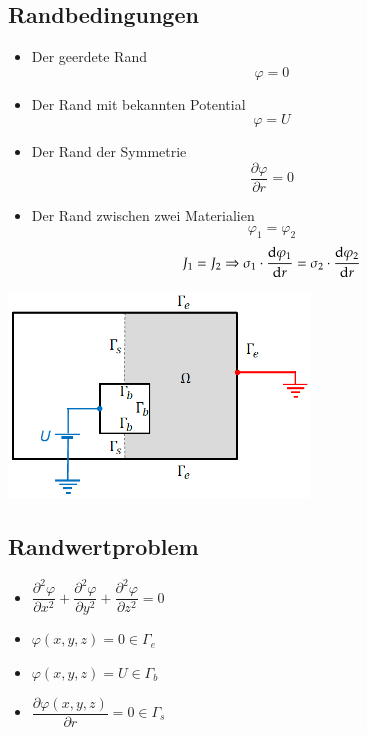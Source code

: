 \subsection{Randbedingungen}
\begin{minipage}{8cm}
	\begin{itemize}
		\item Der geerdete Rand \[\varphi = 0\]
		\item Der Rand mit bekannten Potential \[ \varphi = U \]
		\item Der Rand der Symmetrie \[ \dfrac{\partial\varphi}{\partial r} = 0\]
		\item Der Rand zwischen zwei Materialien \[\varphi_{1}=\varphi_{2}\]
        \[J_{1}=J_{2} \Rightarrow \sigma_{1} \cdot \frac{\mathop{}\!\mathrm{d} \varphi_{1}}{\mathop{}\!\mathrm{d} r}=\sigma_{2} \cdot \frac{\mathop{}\!\mathrm{d} \varphi_{2}}{\mathop{}\!\mathrm{d} r}\]
	\end{itemize}
\end{minipage}
\begin{minipage}{8cm}
	\includegraphics[width=8cm]{images/randbedinung_ES.png}
\end{minipage}
\subsection{Randwertproblem}
\begin{multicols}{2}
	\begin{itemize}
		\item $\dfrac{\partial^2\varphi}{\partial x^2} +  \dfrac{\partial^2\varphi}{\partial y^2} + \dfrac{\partial^2\varphi}{\partial z^2}=0 $
		\item $\varphi(x,y,z)=0 \in \Gamma_e$
		\item $\varphi(x,y,z)=U \in \Gamma_b$
		\item $ \dfrac{\partial\varphi(x,y,z)}{\partial r} = 0 \in \Gamma_s$
	\end{itemize}
\end{multicols}
